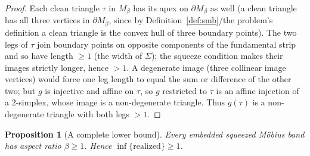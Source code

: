 \documentclass[11pt]{article}
\newtheorem{proposition}{Proposition}
\theoremstyle{definition}
\newcommand{\Sg}{\Sigma}
\newcommand{\bd}{\partial}
\begin{document}
\begin{proof}
Each clean triangle $\tau$ in $M_\beta$ has its apex on $\bd M_\beta$ as well (a clean
triangle has all three vertices in $\bd M_\beta$, since by Definition~\ref{def:smb}/the
problem's definition a clean triangle is the convex hull of three boundary points). The two
legs of $\tau$ join boundary points on opposite components of the fundamental strip and so
have length $\ge1$ (the width of $\Sg$); the squeeze condition makes their images strictly
longer, hence $>1$. A degenerate image (three collinear image vertices) would force one leg
length to equal the sum or difference of the other two; but $g$ is injective and affine on
$\tau$, so $g$ restricted to $\tau$ is an affine injection of a $2$-simplex, whose image is a
non-degenerate triangle. Thus $g(\tau)$ is a non-degenerate triangle with both legs $>1$.
\end{proof}

\begin{proposition}[A complete lower bound]\label{prop:weak}
Every embedded squeezed M\"obius band has aspect ratio $\beta\ge1$. Hence
$\inf\{\text{realized}\}\ge1$.
\end{proposition}
\end{document}

